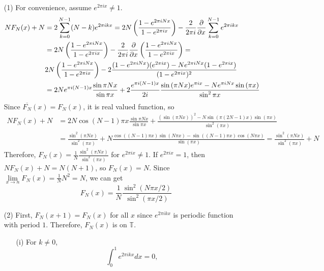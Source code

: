 \documentclass{article}
\begin{document}
\begin{enumerate}
\item[(1)] For convenience, assume $e^{2\pi i x}\neq 1$.
\begin{equation*}
\begin{split}
NF_N(x)+N&=2\sum\limits_{k=0}^{N-1} (N-k)e^{2\pi i k x} = 2N\left(\frac{1-e^{2\pi i N x}}{1-e^{2\pi i x}}\right) - \frac{2}{2\pi i }\pdv{x} \sum\limits_{k=0}^{N-1}e^{2\pi i k x} \\
&=2N\left(\frac{1-e^{2\pi i N x}}{1-e^{2\pi i x}}\right)- \frac{2}{2\pi i }\pdv{x}\left(\frac{1-e^{2\pi i N x}}{1-e^{2\pi i x}}\right) = \\
&2N\left(\frac{1-e^{2\pi i N x}}{1-e^{2\pi i x}}\right) - 2\frac{(1-e^{2\pi i N x})(e^{2\pi i x}) - Ne^{2\pi i N x}(1-e^{2\pi i x})}{(1-e^{2\pi i x})^2} \\
&=2Ne^{\pi i (N-1)x} \frac{\sin{\pi N x}}{\sin{ \pi x}} + 2\frac{e^{\pi i (N-1)x}}{2i}\frac{\sin{(\pi N x)}e^{\pi i x}- Ne^{\pi i N x}\sin{(\pi x)}}{\sin^2{\pi x}}
\end{split}
\end{equation*}
Since $\overline{F_N}(x)=F_N(x)$, it is real valued function, so
\begin{equation*}
\begin{split}
NF_N(x)+N&=2N\cos{(N-1)\pi x}\frac{\sin{\pi N x}}{\sin{ \pi x}} + \frac{\left(\sin(\pi N x)\right)^2 -N \sin(\pi (2N-1) x)\sin(\pi x)}{\sin^2(\pi x)} \\
&=\frac{\sin^2(\pi N x)}{\sin^2(\pi x)} + N\frac{\cos((N-1)\pi x) \sin (N \pi x)- \sin((N-1)\pi x) \cos (N \pi x)}{\sin(\pi x)} = \frac{\sin^2(\pi N x)}{\sin^2(\pi x)} + N
\end{split}
\end{equation*}
Therefore, $F_N(x)=\frac{1}{N}\frac{\sin^2(\pi N x)}{\sin^2(\pi x)}$ for $e^{2\pi i x}\neq 1$. If $e^{2\pi i x}=1$, then $NF_N(x)+N=N(N+1)$, so $F_N(x)=N$. Since $\lim\limits_{x\rightarrow n}F_N(x) = \frac{1}{N}N^2=N$, we can get
\begin{equation*}
F_N(x)=\frac{1}{N}\frac{\sin^2(N\pi x/2)}{\sin^2{(\pi x/2)}}
\end{equation*}
\item[(2)] First, $F_N(x+1)=F_N(x)$ for all $x$ since $e^{2\pi i k x}$ is periodic function with period $1$. Therefore, $F_N(x)$ is on $\mathbb{T}$.
\begin{enumerate}
\item[(i)] For $k\neq 0$,
\begin{equation*}
\int_0^1 e^{2\pi i k x} dx=0,
\end{equation*}

\end{enumerate}
\end{enumerate}
\end{document}
